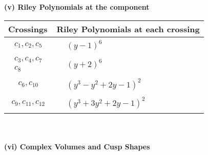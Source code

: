 \documentclass[1p]{elsarticle_modified}
\theoremstyle{definition}
\begin{document}
\newpage\renewcommand{\arraystretch}{1}
\flushleft \textbf{(v) Riley Polynomials at the component}\newline \\
\begin{tabular}{m{50pt}|m{274pt}}
Crossings & \hspace{64pt}Riley Polynomials at each crossing \\
\hline $$\begin{aligned}c_{1},c_{2},c_{5}\end{aligned}$$&$\begin{aligned}
&(y-1)^6
\end{aligned}$\\
\hline $$\begin{aligned}c_{3},c_{4},c_{7}\\c_{8}\end{aligned}$$&$\begin{aligned}
&(y+2)^6
\end{aligned}$\\
\hline $$\begin{aligned}c_{6},c_{10}\end{aligned}$$&$\begin{aligned}
&(y^3- y^2+2 y-1)^2
\end{aligned}$\\
\hline $$\begin{aligned}c_{9},c_{11},c_{12}\end{aligned}$$&$\begin{aligned}
&(y^3+3 y^2+2 y-1)^2
\end{aligned}$\\
\hline
\end{tabular}\\~\\
\newpage\flushleft \textbf{(vi) Complex Volumes and Cusp Shapes}
\end{document}
